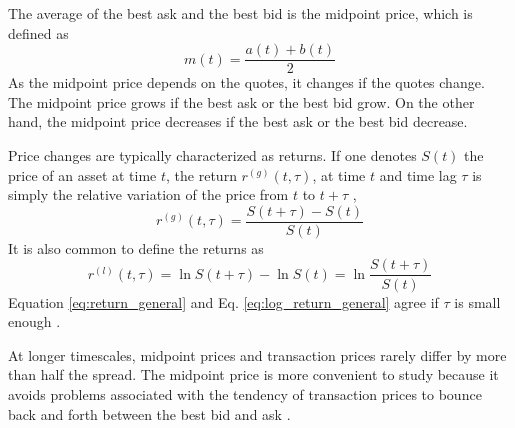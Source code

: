 The average of the best ask and the best bid is the midpoint price, which is
defined as
\cite{prop_order_book,subtle_nature,Bouchaud_2004,large_prices_changes,em_stylized_facts,stat_theory}
\begin{equation}\label{eq:midpoint_price}
    m\left(t\right)=\frac{a\left(t\right)+b\left(t\right)}{2}
\end{equation}
As the midpoint price depends on the quotes, it changes if the quotes change.
The midpoint price grows if the best ask or the best bid grow. On the other
hand, the midpoint price decreases if the best ask or the best bid
decrease.

Price changes are typically characterized as returns. If one denotes
$S\left( t\right)$ the price of an asset at time $t$, the return
$r^{\left(g\right)}\left(t, \tau\right)$, at time $t$ and time lag $\tau$ is
simply the relative variation of the price from $t$ to $t + \tau$
\cite{subtle_nature,empirical_facts,asynchrony_effects_corr,tick_size_impact,causes_epps_effect,non_stationarity},
\begin{equation}\label{eq:return_general}
    r^{\left(g\right)} \left(t, \tau \right) = \frac{S\left(t + \tau\right)
    - S\left(t\right)}{S\left(t\right)}
\end{equation}
It is also common to define the returns as
\cite{dissecting_cross,subtle_nature,empirical_facts,empirical_properties,large_prices_changes,pow_law_dist,theory_market_impact,spread_changes_affect,rand_mat,fluctions_market_friction}
\begin{equation}\label{eq:log_return_general}
    r^{\left(l\right)}\left(t,\tau\right) = \ln S\left(t + \tau\right)
    - \ln S\left(t\right) = \ln \frac{S\left(t + \tau\right)}{S\left(t\right)}
\end{equation}
Equation \ref{eq:return_general} and Eq. \ref{eq:log_return_general} agree if
$\tau$ is small enough \cite{subtle_nature,empirical_facts}.

At longer timescales, midpoint prices and transaction prices rarely differ by
more than half the spread. The midpoint price is more convenient to study
because it avoids problems associated with the tendency of transaction prices
to bounce back and forth between the best bid and ask
\cite{large_prices_changes}.

